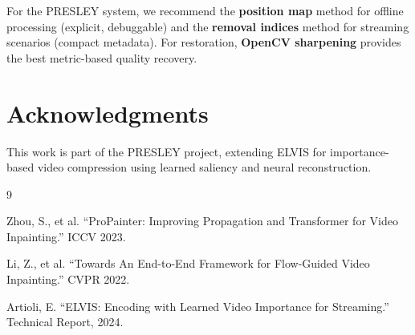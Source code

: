 \documentclass[11pt,a4paper]{article}
\begin{document}
For the PRESLEY system, we recommend the \textbf{position map} method for offline processing (explicit, debuggable) and the \textbf{removal indices} method for streaming scenarios (compact metadata). For restoration, \textbf{OpenCV sharpening} provides the best metric-based quality recovery.

\section*{Acknowledgments}

This work is part of the PRESLEY project, extending ELVIS for importance-based video compression using learned saliency and neural reconstruction.


\begin{thebibliography}{9}

Zhou, S., et al. ``ProPainter: Improving Propagation and Transformer for Video Inpainting.'' ICCV 2023.

Li, Z., et al. ``Towards An End-to-End Framework for Flow-Guided Video Inpainting.'' CVPR 2022.

Artioli, E. ``ELVIS: Encoding with Learned Video Importance for Streaming.'' Technical Report, 2024.

\end{thebibliography}
\end{document}
